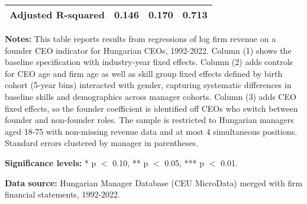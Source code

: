 \begin{table}[htbp]
\begin{threeparttable}
\begin{tabular}{lccc}
Adjusted R-squared&       0.146         &       0.170         &       0.713         \\
\bottomrule
\end{tabular}
\begin{tablenotes}
\footnotesize
\item \textbf{Notes:} This table reports results from regressions of log firm revenue on a founder CEO indicator for Hungarian CEOs, 1992-2022. Column (1) shows the baseline specification with industry-year fixed effects. Column (2) adds controls for CEO age and firm age as well as skill group fixed effects defined by birth cohort (5-year bins) interacted with gender, capturing systematic differences in baseline skills and demographics across manager cohorts. Column (3) adds CEO fixed effects, so the founder coefficient is identified off CEOs who switch between founder and non-founder roles. The sample is restricted to Hungarian managers aged 18-75 with non-missing revenue data and at most 4 simultaneous positions. Standard errors clustered by manager in parentheses.
\item \textbf{Significance levels:} * p $<$ 0.10, ** p $<$ 0.05, *** p $<$ 0.01.
\item \textbf{Data source:} Hungarian Manager Database (CEU MicroData) merged with firm financial statements, 1992-2022.
\end{tablenotes}
\end{threeparttable}
\end{table}

